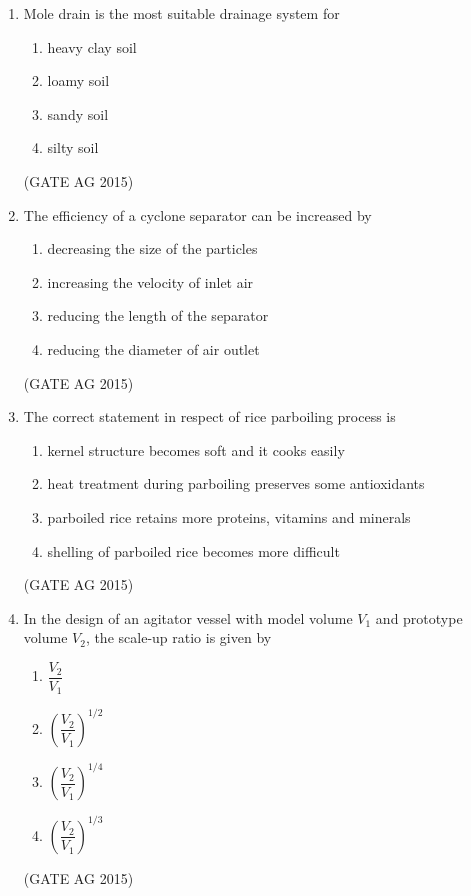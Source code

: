 \documentclass[journal,12pt,onecolumn]{IEEEtran}
\theoremstyle{remark}
\begin{document}
\begin{enumerate}
\item Mole drain is the most suitable drainage system for
\begin{multicols}{4}
\begin{enumerate}
    \item heavy clay soil
    \item loamy soil
    \item sandy soil
    \item silty soil
\end{enumerate}
\end{multicols}
\hfill{(GATE AG 2015)}

\item The efficiency of a cyclone separator can be increased by
\begin{multicols}{2}
\begin{enumerate}
    \item decreasing the size of the particles
    \item increasing the velocity of inlet air
    \item reducing the length of the separator
    \item reducing the diameter of air outlet
\end{enumerate}
\end{multicols}
\hfill{(GATE AG 2015)}

\item The correct statement in respect of rice parboiling process is
\begin{multicols}{2}
\begin{enumerate}
    \item kernel structure becomes soft and it cooks easily
    \item heat treatment during parboiling preserves some antioxidants
    \item parboiled rice retains more proteins, vitamins and minerals
    \item shelling of parboiled rice becomes more difficult
\end{enumerate}
\end{multicols}
\hfill{(GATE AG 2015)}

\item In the design of an agitator vessel with model volume $V_1$ and prototype volume $V_2$, the scale-up ratio is given by
\begin{multicols}{2}
\begin{enumerate}
    \item $\dfrac{V_2}{V_1}$
    \item $\left(\dfrac{V_2}{V_1}\right)^{1/2}$
    \item $\left(\dfrac{V_2}{V_1}\right)^{1/4}$
    \item $\left(\dfrac{V_2}{V_1}\right)^{1/3}$
\end{enumerate}
\end{multicols}
\hfill{(GATE AG 2015)}


\end{enumerate}
\end{document}
